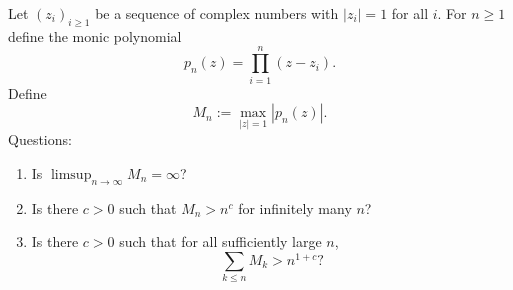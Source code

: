 Let $(z_i)_{i\ge1}$ be a sequence of complex numbers with $|z_i|=1$ for all $i$.
For $n\ge1$ define the monic polynomial
\[
 p_n(z)=\prod_{i=1}^n (z-z_i).
\]
Define
\[
 M_n := \max_{|z|=1} |p_n(z)|.
\]
Questions:
\begin{enumerate}
\item Is $\limsup_{n\to\infty} M_n = \infty$?
\item Is there $c>0$ such that $M_n>n^c$ for infinitely many $n$?
\item Is there $c>0$ such that for all sufficiently large $n$,
\[
\sum_{k\le n} M_k > n^{1+c}?
\]
\end{enumerate}
